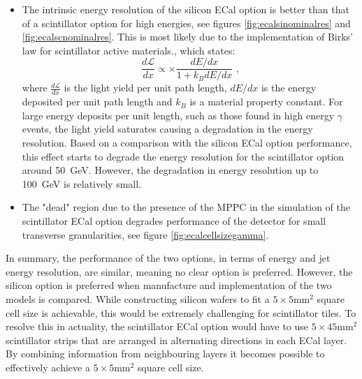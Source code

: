 \begin{itemize}
\item The intrinsic energy resolution of the silicon ECal option is better than that of a scintillator option for high energies, see figures \ref{fig:ecalsinominalres} and \ref{fig:ecalscnominalres}.  This is most likely due to the implementation of Birks' law \cite{BirksLaw} for scintillator active materials., which states:
\begin{equation}
\frac{d\mathcal{L}}{dx} \propto \times \frac{dE/dx}{1+k_{B}dE/dx}\text{ ,}
\end{equation}
where $\frac{d\mathcal{L}}{dx}$ is the light yield per unit path length, $dE/dx$ is the energy deposited per unit path length and $k_{B}$ is a material property constant.  For large energy deposits per unit length, such as those found in high energy $\gamma$ events, the light yield saturates causing a degradation in the energy resolution.  Based on a comparison with the silicon ECal option performance, this effect starts to degrade the energy resolution for the scintillator option around 50~GeV.  However, the degradation in energy resolution up to 100~GeV is relatively small.
\item The "dead" region due to the presence of the MPPC in the simulation of the scintillator ECal option degrades performance of the detector for small transverse granularities, see figure \ref{fig:ecalcellsizegamma}.
\end{itemize}

In summary, the performance of the two options, in terms of energy and jet energy resolution, are similar, meaning no clear option is preferred.  However, the silicon option is preferred when manufacture and implementation of the two models is compared.  While constructing silicon wafers to fit a $5 \times 5 \text{mm}^{2}$ square cell size is achievable, this would be extremely challenging for scintillator tiles.  To resolve this in actuality, the scintillator ECal option would have to use $5 \times 45 \text{mm}^{2}$ scintillator strips that are arranged in alternating directions in each ECal layer.  By combining information from neighbouring layers it becomes possible to effectively achieve a $5 \times 5 \text{mm}^{2}$ square cell size.  


